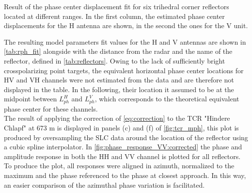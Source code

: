 \begin{table}[ht]
	\centering
	\caption{Result of the phase center displacement fit for six trihedral corner reflectors located at different ranges. In the first column, the estimated phase center displacements for the H antenna are shown, in the second the ones for the V unit.}
	\label{tab:rph_fit}
\end{table}
The resulting model parameters fit values for the H and V antennas are shown in \autoref{tab:rph_fit} alongside with the distance from the radar and the name of the reflector, defined in \autoref{tab:reflectors}. Owing to the lack of sufficiently bright crosspolarizing point targets, the equivalent horizontal phase center locations for HV and VH channels were not estimated from the data and are therefore not displayed in the table. In the following, their location it assumed to be at the midpoint between $L_{ph}^{H}$ and $L_{ph}^{V}$, which corresponds to the theoretical equivalent phase center for these channels.\\
The result of applying the correction of \autoref{eq:correction} to the TCR "Hindere Chlapf" at 673 m is displayed in panels (c) and (f) of \autoref{fig:tcr_mph}, this plot is produced by oversampling the SLC data around the location of the reflector using a cubic spline interpolator.
In \autoref{fig:phase_response_VV:corrected} the phase and amplitude response in both the HH and VV channel is plotted for all reflectors. To produce the plot, all responses were aligned in azimuth, normalized to the maximum and the phase referenced to the phase at closest approach. In this way, an easier comparison of the azimuthal phase variation is facilitated.

